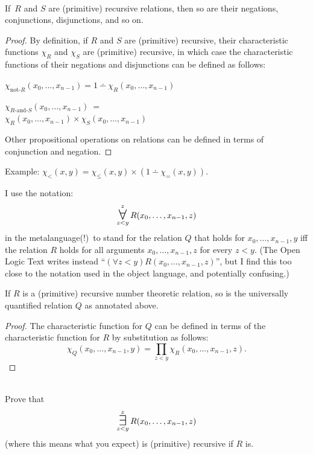 \documentclass[12pt]{report}
\theoremstyle{nonumberplain}
\newtheorem{proof}{Proof}
\newcounter{hwex}
\newenvironment{hw}{\refstepcounter{hwex}\bigskip\noindent\fbox{\textsc{~Homework~\arabic{hwex}~}}\\[0.2\baselineskip]
\noindent}{}
\newcommand{\bigsome}[2]{\mathop{{\mathlarger{\mathlarger{\mathlarger{\mathop{\exists}}}}}}^{#1}_{#2}}
\newcommand{\bigall}[2]{\mathop{{\mathlarger{\mathlarger{\mathlarger{\mathop{\forall}}}}}}^{#1}_{#2}}
\begin{document}
\begin{mt}\phantom{x}\\
If \,$R$ and $S$ are (primitive) recursive relations, then so are their negations, conjunctions, disjunctions, and so on.
\end{mt}
\begin{proof}
By definition, if $R$ and $S$ are (primitive) recursive, their characteristic functions $χ_R$ and $χ_S$ are (primitive) recursive, in which case the characteristic functions of their negations and disjunctions can be defined as follows:

\noindent $χ_{\mathrm{not}\text{-}R} (x_0, \dotsc , x_{n-1}) = 1 \dotminus χ_R (x_0, \dotsc , x_{n-1})$

\noindent $χ_{R\text{-}\mathrm{and}\text{-}S} (x_0, \dotsc , x_{n-1})\ =$ \\ \phantom{a}\hfill $χ_R (x_0, \dotsc , x_{n-1}) ×
χ_S (x_0, \dotsc , x_{n-1})$

\noindent Other propositional operations on relations can be defined in terms of conjunction and negation.
\end{proof}

\noindent Example: $χ_{<}(x,y) = χ_{≤}(x,y) × (1 \dotminus χ_{=}(x,y) )$.

\medskip\noindent I use the notation:
\[	\bigall{z}{z < y} R(x_0, \dotsc , x_{n-1}, z) \]
in the metalanguage(!)\ to stand for the relation $Q$ that holds for $x_0, \dotsc , x_{n-1}, y$ iff the relation $R$ holds for all arguments $x_0, \dotsc , x_{n-1}, z$ for every $z < y$. (The Open Logic Text writes instead \linebreak``$(∀z < y) R(x_0, \dotsc, x_{n-1}, z)$'', but I find this too close to the notation used in the object language, and potentially confusing.)

\begin{mt}
If $R$ is a (primitive) recursive number theoretic relation, so is the universally quantified relation $Q$ as annotated above.
\end{mt}
\begin{proof}
The characteristic function for $Q$ can be defined in terms of the characteristic function for $R$ by substitution as follows:
\begin{equation*} χ_Q(x_0, \dotsc , x_{n-1}, y) = \prod_{z < y} χ_R(x_0, \dotsc , x_{n-1}, z).\end{equation*}
\end{proof}

\begin{hw}
Prove that \[\bigsome{z}{z < y} R(x_0, \dotsc , x_{n-1}, z)\]
(where this means what you expect) is (primitive) recursive if $R$ is.
\end{hw}
\end{document}
